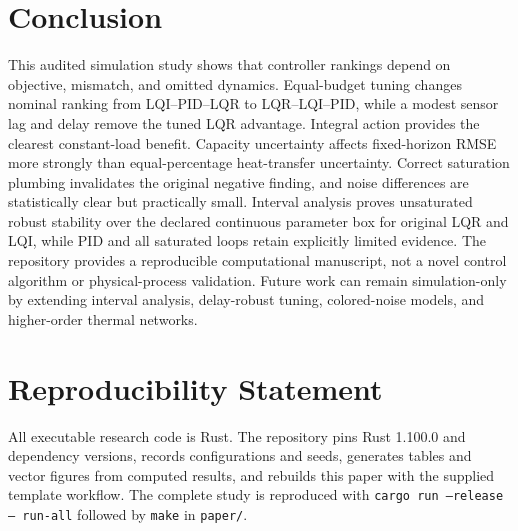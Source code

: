 \section{Conclusion}
This audited simulation study shows that controller rankings depend on objective, mismatch, and omitted dynamics. Equal-budget tuning changes nominal ranking from LQI--PID--LQR to LQR--LQI--PID, while a modest sensor lag and delay remove the tuned LQR advantage. Integral action provides the clearest constant-load benefit. Capacity uncertainty affects fixed-horizon RMSE more strongly than equal-percentage heat-transfer uncertainty. Correct saturation plumbing invalidates the original negative finding, and noise differences are statistically clear but practically small. Interval analysis proves unsaturated robust stability over the declared continuous parameter box for original LQR and LQI, while PID and all saturated loops retain explicitly limited evidence. The repository provides a reproducible computational manuscript, not a novel control algorithm or physical-process validation. Future work can remain simulation-only by extending interval analysis, delay-robust tuning, colored-noise models, and higher-order thermal networks.

\section*{Reproducibility Statement}
All executable research code is Rust. The repository pins Rust 1.100.0 and dependency versions, records configurations and seeds, generates tables and vector figures from computed results, and rebuilds this paper with the supplied template workflow. The complete study is reproduced with \texttt{cargo run --release -- run-all} followed by \texttt{make} in \texttt{paper/}.
